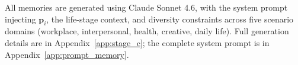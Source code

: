 \documentclass{article}
\begin{document}

All memories are generated using Claude Sonnet 4.6, with the system prompt injecting $\mathbf{p}_i$, the life-stage context, and diversity constraints across five scenario domains (workplace, interpersonal, health, creative, daily life). Full generation details are in Appendix~\ref{app:stage_c}; the complete system prompt is in Appendix~\ref{app:prompt_memory}.
\end{document}
